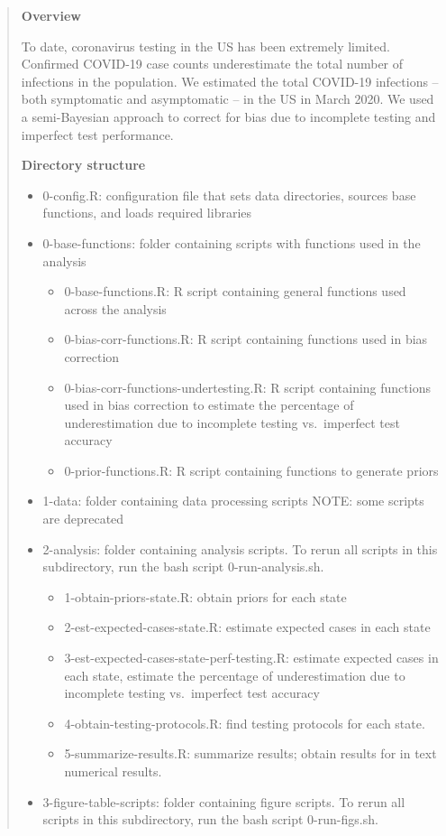 \documentclass[]{book}
\begin{document}
\begin{quote}
\textbf{Overview}

To date, coronavirus testing in the US has been extremely limited.
Confirmed COVID-19 case counts underestimate the total number of
infections in the population. We estimated the total COVID-19 infections
-- both symptomatic and asymptomatic -- in the US in March 2020. We used
a semi-Bayesian approach to correct for bias due to incomplete testing
and imperfect test performance.

\textbf{Directory structure}

\begin{itemize}
\item
  0-config.R: configuration file that sets data directories, sources
  base functions, and loads required libraries
\item
  0-base-functions: folder containing scripts with functions used in the
  analysis

  \begin{itemize}
  \item
    0-base-functions.R: R script containing general functions used
    across the analysis
  \item
    0-bias-corr-functions.R: R script containing functions used in bias
    correction
  \item
    0-bias-corr-functions-undertesting.R: R script containing functions
    used in bias correction to estimate the percentage of
    underestimation due to incomplete testing vs.~imperfect test
    accuracy
  \item
    0-prior-functions.R: R script containing functions to generate
    priors
  \end{itemize}
\item
  1-data: folder containing data processing scripts NOTE: some scripts
  are deprecated
\item
  2-analysis: folder containing analysis scripts. To rerun all scripts
  in this subdirectory, run the bash script 0-run-analysis.sh.

  \begin{itemize}
  \item
    1-obtain-priors-state.R: obtain priors for each state
  \item
    2-est-expected-cases-state.R: estimate expected cases in each state
  \item
    3-est-expected-cases-state-perf-testing.R: estimate expected cases
    in each state, estimate the percentage of underestimation due to
    incomplete testing vs.~imperfect test accuracy
  \item
    4-obtain-testing-protocols.R: find testing protocols for each state.
  \item
    5-summarize-results.R: summarize results; obtain results for in text
    numerical results.
  \end{itemize}
\item
  3-figure-table-scripts: folder containing figure scripts. To rerun all
  scripts in this subdirectory, run the bash script 0-run-figs.sh.


\end{itemize}
\end{quote}
\end{document}
